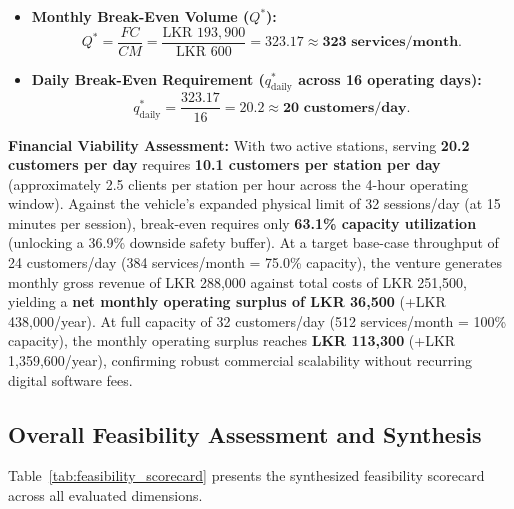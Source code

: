 \begin{itemize}[leftmargin=1.5em, itemsep=0.15em]
\begin{itemize}[leftmargin=1.2em, itemsep=0.1em]
        \item Preventative maintenance, vehicle insurance, and equipment reserve: LKR 12,000.
    \end{itemize}
    Total monthly fixed operating costs are established at $FC = \mathbf{\text{LKR } 193,900}$ per month.
    \item \textbf{Monthly Break-Even Volume ($Q^*$):}
    \begin{equation}
        Q^* = \frac{FC}{CM} = \frac{\text{LKR } 193,900}{\text{LKR } 600} = \mathbf{323.17 \approx 323\text{ services/month}}.
    \end{equation}
    \item \textbf{Daily Break-Even Requirement ($q^*_{\text{daily}}$ across 16 operating days):}
    \begin{equation}
        q^*_{\text{daily}} = \frac{323.17}{16} = \mathbf{20.2 \approx 20\text{ customers/day}}.
    \end{equation}
\end{itemize}

\textbf{Financial Viability Assessment:} With two active stations, serving \textbf{20.2 customers per day} requires \textbf{10.1 customers per station per day} (approximately 2.5 clients per station per hour across the 4-hour operating window). Against the vehicle's expanded physical limit of 32 sessions/day (at 15 minutes per session), break-even requires only \textbf{63.1\% capacity utilization} (unlocking a 36.9\% downside safety buffer). At a target base-case throughput of 24 customers/day (384 services/month = 75.0\% capacity), the venture generates monthly gross revenue of LKR 288,000 against total costs of LKR 251,500, yielding a \textbf{net monthly operating surplus of LKR 36,500} (+LKR 438,000/year). At full capacity of 32 customers/day (512 services/month = 100\% capacity), the monthly operating surplus reaches \textbf{LKR 113,300} (+LKR 1,359,600/year), confirming robust commercial scalability without recurring digital software fees.

\subsection{Overall Feasibility Assessment and Synthesis}
\label{subsec:overall_feasibility_synthesis}

Table~\ref{tab:feasibility_scorecard} presents the synthesized feasibility scorecard across all evaluated dimensions.

